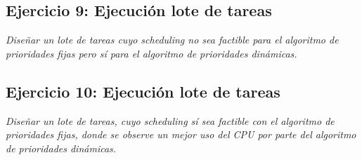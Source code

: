 \documentclass[a4paper]{article}
\begin{document}
 \subsection{Ejercicio 9:  Ejecuci\'on lote de tareas}
\textit{Dise\~nar un lote de tareas cuyo scheduling no sea factible para el algoritmo de prioridades fijas pero s\'i para el algoritmo de prioridades din\'amicas.}

 \subsection{Ejercicio 10:  Ejecuci\'on lote de tareas}
\textit{Dise\~nar un lote de tareas, cuyo scheduling s\'i sea factible con el algoritmo de prioridades fijas, donde se observe un mejor uso del CPU por parte del algoritmo de prioridades din\'amicas.}
\end{document}
